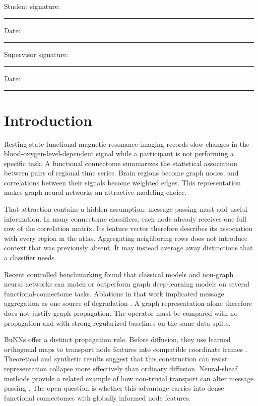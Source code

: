 \documentclass[11pt,a4paper]{article}
\begin{document}
\vspace{1.2cm}
\noindent Student signature: \rule{7.2cm}{0.4pt}\hfill Date: \rule{3.0cm}{0.4pt}

\vspace{1.2cm}
\noindent Supervisor signature: \rule{6.6cm}{0.4pt}\hfill Date: \rule{3.0cm}{0.4pt}

\clearpage
\tableofcontents
\clearpage

\setcounter{page}{1}

\section{Introduction}

Resting-state functional magnetic resonance imaging records slow changes in
the blood-oxygen-level-dependent signal while a participant is not performing
a specific task. A functional connectome summarizes the statistical
association between pairs of regional time series. Brain regions become graph
nodes, and correlations between their signals become weighted edges. This
representation makes graph neural networks an attractive modeling choice.

That attraction contains a hidden assumption: message passing must add useful
information. In many connectome classifiers, each node already receives one
full row of the correlation matrix. Its feature vector therefore describes
its association with every region in the atlas. Aggregating neighboring rows
does not introduce context that was previously absent. It may instead average
away distinctions that a classifier needs.

Recent controlled benchmarking found that classical models and non-graph
neural networks can match or outperform graph deep-learning models on several
functional-connectome tasks. Ablations in that work implicated message
aggregation as one source of degradation \cite{han2026rethinking}. A graph
representation alone therefore does not justify graph propagation. The
operator must be compared with no propagation and with strong regularized
baselines on the same data splits.

BuNNs offer a distinct propagation rule. Before diffusion, they use learned
orthogonal maps to transport node features into compatible coordinate frames
\cite{bamberger2025bundle}. Theoretical and synthetic results suggest that this
construction can resist representation collapse more effectively than
ordinary diffusion. Neural-sheaf methods provide a related example of how
non-trivial transport can alter message passing \cite{bodnar2022sheaf}. The
open question is whether this advantage carries into dense functional
connectomes with globally informed node features.
\end{document}
